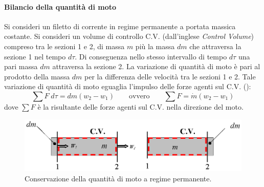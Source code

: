\paragraph{Bilancio della quantità di moto}
Si consideri un filetto di corrente in regime permanente a portata massica costante. Si consideri un volume di controllo C.V. (dall'inglese \textit{Control Volume}) compreso tra le sezioni 1 e 2, di massa $m$ più la massa $dm$ che attraversa la sezione 1 nel tempo $d\tau$. Di conseguenza nello stesso intervallo di tempo $d\tau$ una pari massa $dm$ attraversa la sezione 2. La variazione di quantità di moto è pari al prodotto della massa $dm$ per la differenza delle velocità tra le sezioni 1 e 2. Tale variazione di quantità di moto eguaglia l'impulso delle forze agenti sul C.V. ():
\[\sum{F\;d\tau}=dm(w_2-w_1)\qquad \textrm{ovvero}\qquad \sum{F}=\dot{m}(w_2-w_1)\]
dove \(\sum{F}\) è la risultante delle forze agenti sul C.V. nella direzione del moto.
\begin{figure}[!htbp] %
    \centering
    \includegraphics[width=\textwidth]{fig/fluidodinamica/quantitamoto.eps}
    \caption{Conservazione della quantità di moto a regime permanente.} 
    \label{fig:quantitamoto}
\end{figure}

